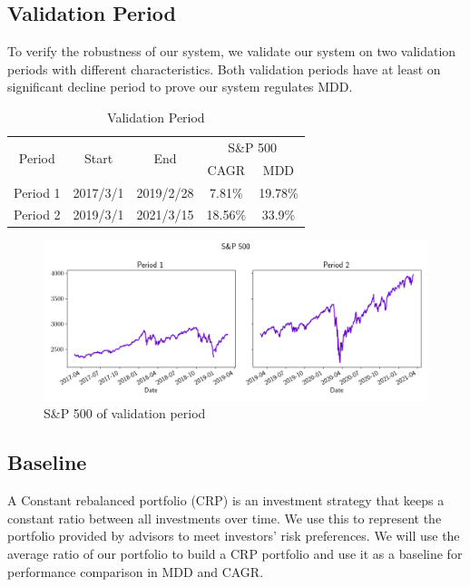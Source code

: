\subsection{Validation Period}
To verify the robustness of our system, we validate our system on two validation periods with different characteristics. Both validation periods have at least on significant decline period to prove our system regulates MDD.
\begin{table}[htb]
    \centering
    \begin{tabular}{||c|c|c|c|c||}
    \hline \hline
    \multirow{2}{*}{Period} &
    \multirow{2}{*}{Start} &
    \multirow{2}{*}{End} &
    \multicolumn{2}{c|}{S\&P 500} \\ 
    \cline{4-5} &{} &{} & CAGR & MDD \\ \hline \hline
    Period 1 & 2017/3/1 & 2019/2/28 & 7.81\% & 19.78\% \\ \hline
    Period 2 & 2019/3/1 & 2021/3/15 & 18.56\% & 33.9\% \\    
    \hline \hline
    \end{tabular}
    \caption{Validation Period}
    \label{tab:validation_period}
\end{table}
\begin{figure}[htb]
    \centering
    \includegraphics[width=15cm]{images/sp500.png}
    \caption{S\&P 500 of validation period}
    \label{fig:my_label}
\end{figure}

\subsection{Baseline}
A Constant rebalanced portfolio (CRP) is an investment strategy that keeps a constant ratio between all investments over time. We use this to represent the portfolio provided by advisors to meet investors' risk preferences. We will use the average ratio of our portfolio to build a CRP portfolio and use it as a baseline for performance comparison in MDD and CAGR.
